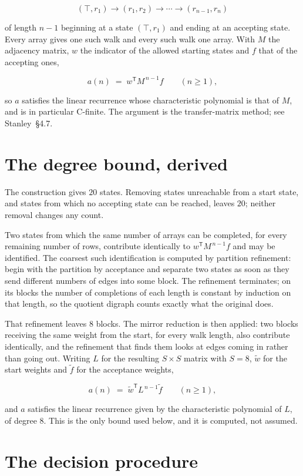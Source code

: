 \documentclass[11pt]{article}
\theoremstyle{definition}
\begin{document}
\[(\top,r_1) \to (r_1,r_2) \to \cdots \to (r_{n-1},r_n)\]

of length $n-1$ beginning at a state $(\top,r_1)$ and ending at an accepting state. Every array gives one such walk and every such walk one array. With $M$ the adjacency matrix, $w$ the indicator of the allowed starting states and $f$ that of the accepting ones,

\[a(n) \;=\; w^{\mathsf T} M^{\,n-1} f \qquad (n \ge 1),\]

so $a$ satisfies the linear recurrence whose characteristic polynomial is that of $M$, and is in particular C-finite. The argument is the transfer-matrix method; see Stanley~\S4.7.

\section{The degree bound, derived}

The construction gives $20$ states. Removing states unreachable from a start state, and states from which no accepting state can be reached, leaves $20$; neither removal changes any count.

Two states from which the same number of arrays can be completed, for every remaining number of rows, contribute identically to $w^{\mathsf T}M^{\,n-1}f$ and may be identified. The coarsest such identification is computed by partition refinement: begin with the partition by acceptance and separate two states as soon as they send different numbers of edges into some block. The refinement terminates; on its blocks the number of completions of each length is constant by induction on that length, so the quotient digraph counts exactly what the original does.

That refinement leaves $8$ blocks. The mirror reduction is then applied: two blocks receiving the same weight from the start, for every walk length, also contribute identically, and the refinement that finds them looks at edges coming in rather than going out. Writing $L$ for the resulting $S \times S$ matrix with $S = 8$, $\tilde w$ for the start weights and $\tilde f$ for the acceptance weights,

\[a(n) \;=\; \tilde w^{\mathsf T} L^{\,n-1} \tilde f \qquad (n \ge 1),\]

and $a$ satisfies the linear recurrence given by the characteristic polynomial of $L$, of degree $8$. This is the only bound used below, and it is computed, not assumed.

\section{The decision procedure}
\end{document}
